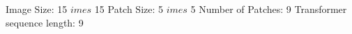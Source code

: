 \documentclass[preview]{standalone}
\begin{document}
\begin{center}
Image Size: 15 $	imes$ 15 
 Patch Size: 5 $	imes$ 5 
 Number of Patches: 9 
 Transformer sequence length: 9
\end{center}
\end{document}
